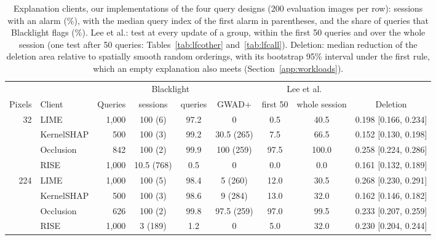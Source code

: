 \begin{table}[!tbp]
\centering\footnotesize\setlength{\tabcolsep}{4pt}
\caption{Explanation clients, our implementations of the four query designs (200 evaluation images per row): sessions with an alarm (\%), with the median query index of the first alarm in parentheses, and the share of queries that Blacklight flags (\%). Lee et al.: test at every update of a group, within the first 50 queries and over the whole session (one test after 50 queries: Tables~\ref{tab:lfcother} and~\ref{tab:lfcall}). Deletion: median reduction of the deletion area relative to spatially smooth random orderings, with its bootstrap 95\% interval under the first rule, which an empty explanation also meets (Section~\ref{app:workloads}).}
\label{tab:explanations}
\vspace{3pt}
\begin{adjustbox}{max width=\textwidth}
\begin{tabular}{rlrcccccc}
\toprule
& & & \multicolumn{2}{c}{Blacklight} & & \multicolumn{2}{c}{Lee et al.} & \\
\cmidrule(lr){4-5}\cmidrule(lr){7-8}
Pixels & Client & Queries & sessions & queries & GWAD+ & first 50 & whole session & Deletion \\
\midrule
32 & LIME & 1{,}000 & 100 (6) & 97.2 & 0 & 0.5 & 40.5 & 0.198 {[}0.166, 0.234{]} \\
 & KernelSHAP & 500 & 100 (3) & 99.2 & 30.5 (265) & 7.5 & 66.5 & 0.152 {[}0.130, 0.198{]} \\
 & Occlusion & 842 & 100 (2) & 99.9 & 100 (259) & 97.5 & 100.0 & 0.258 {[}0.224, 0.286{]} \\
 & RISE & 1{,}000 & 10.5 (768) & 0.5 & 0 & 0.0 & 0.0 & 0.161 {[}0.132, 0.189{]} \\[2pt]
224 & LIME & 1{,}000 & 100 (5) & 98.4 & 5 (260) & 12.0 & 30.5 & 0.268 {[}0.230, 0.291{]} \\
 & KernelSHAP & 500 & 100 (3) & 98.6 & 9 (284) & 13.0 & 32.0 & 0.162 {[}0.146, 0.182{]} \\
 & Occlusion & 626 & 100 (2) & 99.8 & 97.5 (259) & 97.0 & 99.5 & 0.233 {[}0.207, 0.259{]} \\
 & RISE & 1{,}000 & 3 (189) & 1.2 & 0 & 5.0 & 32.0 & 0.230 {[}0.204, 0.244{]} \\
\bottomrule
\end{tabular}
\end{adjustbox}
\end{table}
